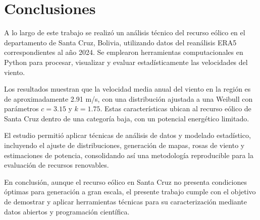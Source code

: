 \documentclass[a4paper,12pt]{article}
\begin{document}
		\section{Conclusiones}
		
		A lo largo de este trabajo se realizó un análisis técnico del recurso eólico en el departamento de Santa Cruz, Bolivia, utilizando datos del reanálisis ERA5 correspondientes al año 2024. Se emplearon herramientas computacionales en Python para procesar, visualizar y evaluar estadísticamente las velocidades del viento.
		
		Los resultados muestran que la velocidad media anual del viento en la región es de aproximadamente 2.91 m/s, con una distribución ajustada a una Weibull con parámetros \(c = 3.15\) y \(k = 1.75\). Estas características ubican al recurso eólico de Santa Cruz dentro de una categoría baja, con un potencial energético limitado.
		
		El estudio permitió aplicar técnicas de análisis de datos y modelado estadístico, incluyendo el ajuste de distribuciones, generación de mapas, rosas de viento y estimaciones de potencia, consolidando así una metodología reproducible para la evaluación de recursos renovables.
		
		En conclusión, aunque el recurso eólico en Santa Cruz no presenta condiciones óptimas para generación a gran escala, el presente trabajo cumple con el objetivo de demostrar y aplicar herramientas técnicas para su caracterización mediante datos abiertos y programación científica.
		
	\appendix
	
\end{document}
